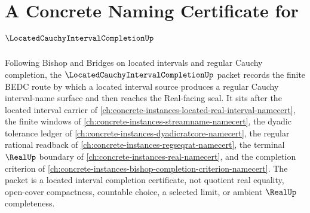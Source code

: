 \chapter{A Concrete Naming Certificate for $\LocatedCauchyIntervalCompletionUp$}
\label{ch:concrete-instances-located-cauchy-interval-completion-namecert}

Following Bishop and Bridges on located intervals and regular Cauchy completion, the $\LocatedCauchyIntervalCompletionUp$ packet records the finite BEDC route by which a located interval source produces a regular Cauchy interval-name surface and then reaches the Real-facing seal. It sits after the located interval carrier of \autoref{ch:concrete-instances-located-real-interval-namecert}, the finite windows of \autoref{ch:concrete-instances-streamname-namecert}, the dyadic tolerance ledger of \autoref{ch:concrete-instances-dyadicratcore-namecert}, the regular rational readback of \autoref{ch:concrete-instances-regseqrat-namecert}, the terminal $\RealUp$ boundary of \autoref{ch:concrete-instances-real-namecert}, and the completion criterion of \autoref{ch:concrete-instances-bishop-completion-criterion-namecert}. The packet is a located interval completion certificate, not quotient real equality, open-cover compactness, countable choice, a selected limit, or ambient $\RealUp$ completeness.

